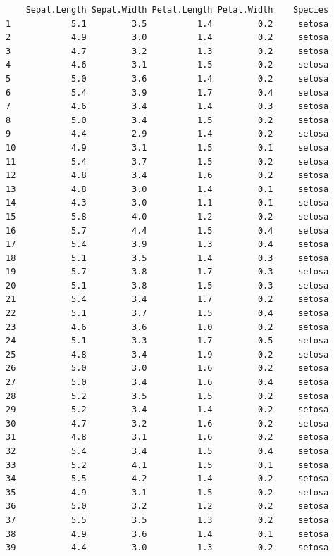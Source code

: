 \documentclass[
  letterpaper,
]{book}
\begin{document}
\begin{verbatim}
    Sepal.Length Sepal.Width Petal.Length Petal.Width    Species
1            5.1         3.5          1.4         0.2     setosa
2            4.9         3.0          1.4         0.2     setosa
3            4.7         3.2          1.3         0.2     setosa
4            4.6         3.1          1.5         0.2     setosa
5            5.0         3.6          1.4         0.2     setosa
6            5.4         3.9          1.7         0.4     setosa
7            4.6         3.4          1.4         0.3     setosa
8            5.0         3.4          1.5         0.2     setosa
9            4.4         2.9          1.4         0.2     setosa
10           4.9         3.1          1.5         0.1     setosa
11           5.4         3.7          1.5         0.2     setosa
12           4.8         3.4          1.6         0.2     setosa
13           4.8         3.0          1.4         0.1     setosa
14           4.3         3.0          1.1         0.1     setosa
15           5.8         4.0          1.2         0.2     setosa
16           5.7         4.4          1.5         0.4     setosa
17           5.4         3.9          1.3         0.4     setosa
18           5.1         3.5          1.4         0.3     setosa
19           5.7         3.8          1.7         0.3     setosa
20           5.1         3.8          1.5         0.3     setosa
21           5.4         3.4          1.7         0.2     setosa
22           5.1         3.7          1.5         0.4     setosa
23           4.6         3.6          1.0         0.2     setosa
24           5.1         3.3          1.7         0.5     setosa
25           4.8         3.4          1.9         0.2     setosa
26           5.0         3.0          1.6         0.2     setosa
27           5.0         3.4          1.6         0.4     setosa
28           5.2         3.5          1.5         0.2     setosa
29           5.2         3.4          1.4         0.2     setosa
30           4.7         3.2          1.6         0.2     setosa
31           4.8         3.1          1.6         0.2     setosa
32           5.4         3.4          1.5         0.4     setosa
33           5.2         4.1          1.5         0.1     setosa
34           5.5         4.2          1.4         0.2     setosa
35           4.9         3.1          1.5         0.2     setosa
36           5.0         3.2          1.2         0.2     setosa
37           5.5         3.5          1.3         0.2     setosa
38           4.9         3.6          1.4         0.1     setosa
39           4.4         3.0          1.3         0.2     setosa

\end{verbatim}
\end{document}
